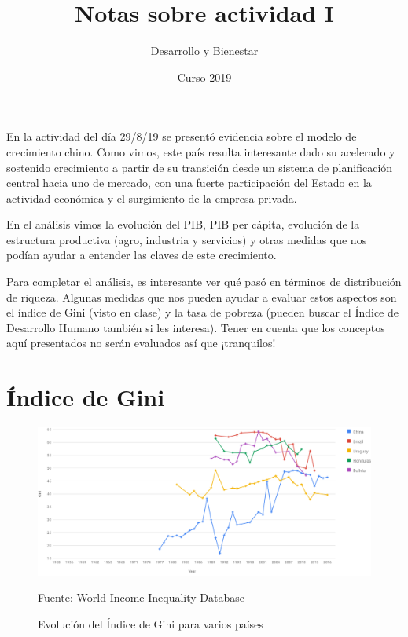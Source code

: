 \documentclass[11pt]{article}
\begin{document}
	
	
	\renewcommand{\thefootnote}{\fnsymbol{footnote}}
	\setcounter{footnote}{1}
	
	\title{Notas sobre actividad I}

	\author{Desarrollo y Bienestar}

	\date{Curso 2019}
	
	\maketitle
	
	\noindent En la actividad del día 29/8/19 se presentó evidencia sobre el modelo de crecimiento chino. Como vimos, este país resulta interesante dado su acelerado y sostenido crecimiento a partir de su transición desde un sistema de planificación central hacia uno de mercado, con una fuerte participación del Estado en la actividad económica y el surgimiento de la empresa privada. \newline
	
	En el análisis vimos la evolución del PIB, PIB per cápita, evolución de la estructura productiva (agro, industria y servicios) y otras medidas que nos podían ayudar a entender las claves de este crecimiento. \newline
	
	Para completar el análisis, es interesante ver qué pasó en términos de distribución de riqueza. Algunas medidas que nos pueden ayudar a evaluar estos aspectos son el índice de Gini (visto en clase) y la tasa de pobreza (pueden buscar el Índice de Desarrollo Humano también si les interesa). Tener en cuenta que los conceptos aquí presentados no serán evaluados así que ¡tranquilos!
	
	\section{Índice de Gini}
	
	\begin{figure}[H]
		\centering
		\begin{minipage}{.8\textwidth}
			\includegraphics[width=\textwidth]{gini}
			{\footnotesize Fuente: World Income Inequality Database\par}
		\end{minipage}
		\caption{Evolución del Índice de Gini para varios países}
	\end{figure}
	
\end{document}
